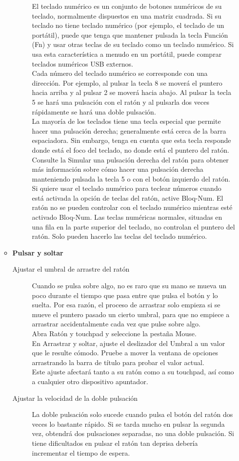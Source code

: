 \documentclass[12pt,letterpaper]{book}
\begin{document}
\begin{itemize}
\begin{itemize}
\begin{description}
El teclado numérico es un conjunto de botones numéricos de su teclado, normalmente dispuestos en una matriz cuadrada. Si su teclado no tiene teclado numérico (por ejemplo, el teclado de un portátil), puede que tenga que mantener pulsada la tecla Función (Fn) y usar otras teclas de su teclado como un teclado numérico. Si usa esta característica a menudo en un portátil, puede comprar teclados numéricos USB externos.\\
Cada número del teclado numérico se corresponde con una dirección. Por ejemplo, al pulsar la tecla 8 se moverá el puntero hacia arriba y al pulsar 2 se moverá hacia abajo. Al pulsar la tecla 5 se hará una pulsación con el ratón y al pulsarla dos veces rápidamente se hará una doble pulsación.\\
La mayoría de los teclados tiene una tecla especial que permite hacer una pulsación derecha; generalmente está cerca de la barra espaciadora. Sin embargo, tenga en cuenta que esta tecla responde donde está el foco del teclado, no donde está el puntero del ratón. Consulte la Simular una pulsación derecha del ratón para obtener más información sobre cómo hacer una pulsación derecha manteniendo pulsada la tecla 5 o con el botón izquierdo del ratón.\\
Si quiere usar el teclado numérico para teclear números cuando está activada la opción de teclas del ratón, active Bloq-Num. El ratón no se pueden controlar con el teclado numérico mientras esté activado Bloq-Num.
Las teclas numéricas normales, situadas en una fila en la parte superior del teclado, no controlan el puntero del ratón. Solo pueden hacerlo las teclas del teclado numérico.
			\end{description}
		\item {\large \bf Pulsar y soltar}
			\begin{description}
				\item[Ajustar el umbral de arrastre del ratón] Cuando se pulsa sobre algo, no es raro que su mano se mueva un poco durante el tiempo que pasa entre que pulsa el botón y lo suelta. Por esa razón, el proceso de arrastrar solo empieza si se mueve el puntero pasado un cierto umbral, para que no empiece a arrastrar accidentalmente cada vez que pulse sobre algo.\\

Abra Ratón y touchpad y seleccione la pestaña Mouse.\\
En Arrastrar y soltar, ajuste el deslizador del Umbral a un valor que le resulte cómodo. Pruebe a mover la ventana de opciones arrastrando la barra de título para probar el valor actual.\\
Este ajuste afectará tanto a su ratón como a su touchpad, así como a cualquier otro dispositivo apuntador.
				\item[Ajustar la velocidad de la doble pulsación] La doble pulsación solo sucede cuando pulsa el botón del ratón dos veces lo bastante rápido. Si se tarda mucho en pulsar la segunda vez, obtendrá dos pulsaciones separadas, no una doble pulsación. Si tiene dificultados en pulsar el ratón tan deprisa debería incrementar el tiempo de espera.\\


\end{description}
\end{itemize}
\end{itemize}
\end{document}
